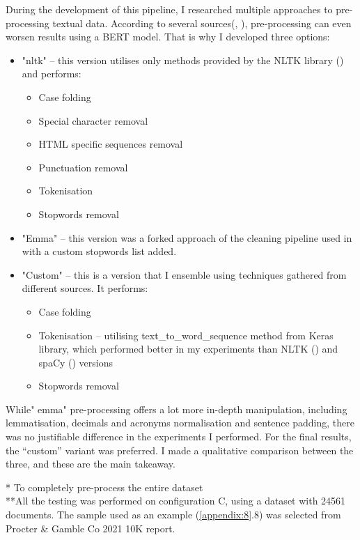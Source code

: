 \documentclass[12pt,MSc,a4paper,oneside]{muthesis}
\begin{document}
During the development of this pipeline, I researched multiple approaches to pre-processing textual data. According to several sources(\cite{DBLP:journals/corr/abs-2109-13890}, \cite{bert-clear-data}), pre-processing can even worsen results using a BERT model. That is why I developed three options:
\begin{itemize}
    \item   "nltk" – this version utilises only methods provided by the NLTK library (\cite{nltk})  and performs:
        \begin{itemize}
            \item Case folding
            \item Special character removal
            \item HTML specific sequences removal
            \item Punctuation removal
            \item Tokenisation
            \item Stopwords removal
        \end{itemize}
    \item "Emma" – this version was a forked approach of the cleaning pipeline used in \cite{Tattershall2019DetectingBT} with a custom stopwords list added.
    \item "Custom" – this is a version that I ensemble using techniques gathered from different sources. It performs:
     \begin{itemize}
            \item Case folding
            \item Tokenisation – utilising text\_to\_word\_sequence \cite{text-tokenizer-keras} method from Keras \cite{chollet2015keras} library, which performed better in my experiments than NLTK (\cite{nltk}) and spaCy (\cite{spacy2}) versions
            \item Stopwords removal
    \end{itemize}
\end{itemize}

While" emma" pre-processing offers a lot more in-depth manipulation, including lemmatisation, decimals and acronyms normalisation and sentence padding, there was no justifiable difference in the experiments I performed. For the final results, the “custom” variant was preferred. 
I made a qualitative comparison between the three, and these are the main takeaway.

* To completely pre-process the entire dataset \\
**All the testing was performed on configuration C, using a dataset with 24561 documents. The sample used as an example (\ref{appendix:8}.8) was selected from Procter & Gamble Co 2021 10K report. \\
\end{document}

